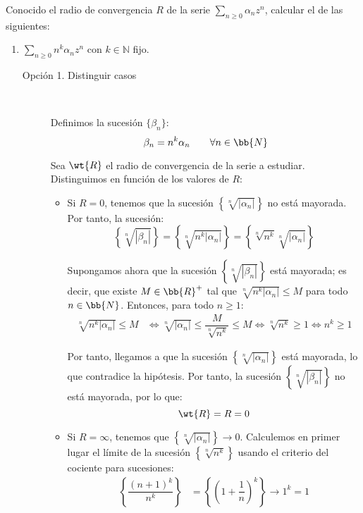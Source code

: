\begin{ejercicio}
    Conocido el radio de convergencia $R$ de la serie $\displaystyle \sum_{n \geq 0} \alpha_nz^n$, calcular el de las siguientes:
    \begin{enumerate}
        \item $\displaystyle \sum_{n \geq 0} n^k\alpha_nz^n$ con $k \in \mathbb{N}$ fijo.
        
        \begin{description}
            \item[Opción 1. Distinguir casos]~
            
            Definimos la sucesión $\{\beta_n\}$:
        \[
            \beta_n = n^k\alpha_n\qquad \forall n\in \bb{N}
        \]

        Sea $\wt{R}$ el radio de convergencia de la serie a estudiar. Distinguimos en función de los valores de $R$:
        \begin{itemize}
            \item Si $R=0$, tenemos que la sucesión $\left\{\sqrt[n]{|\alpha_n|}\right\}$ no está mayorada. Por tanto, la sucesión:
            \begin{equation*}
                \left\{\sqrt[n]{|\beta_n|}\right\} = \left\{\sqrt[n]{n^k|\alpha_n|}\right\}
                = \left\{\sqrt[n]{n^k}\sqrt[n]{|\alpha_n|}\right\}
            \end{equation*}

            Supongamos ahora que la sucesión $\left\{\sqrt[n]{|\beta_n|}\right\}$ está mayorada; es decir, que existe $M\in \bb{R}^+$ tal que $\sqrt[n]{n^k|\alpha_n|}\leq M$ para todo $n\in \bb{N}$. Entonces, para todo $n\geq 1$:
            \begin{align*}
                \sqrt[n]{n^k|\alpha_n|}\leq M &\iff \sqrt[n]{|\alpha_n|}\leq \dfrac{M}{\sqrt[n]{n^k}}\leq M\iff \sqrt[n]{n^k}\geq 1\iff n^k\geq 1
            \end{align*}

            Por tanto, llegamos a que la sucesión $\left\{\sqrt[n]{|\alpha_n|}\right\}$ está mayorada, lo que contradice la hipótesis. Por tanto, la sucesión $\left\{\sqrt[n]{|\beta_n|}\right\}$ no está mayorada, por lo que:
            \begin{equation*}
                \wt{R} = R=0
            \end{equation*}

            \item Si $R=\infty$, tenemos que $\left\{\sqrt[n]{|\alpha_n|}\right\}\to 0$. Calculemos en primer lugar el límite de la sucesión $\left\{\sqrt[n]{n^k}\right\}$ usando el criterio del cociente para sucesiones:
            \begin{align*}
                \left\{\dfrac{(n+1)^k}{n^k}\right\} &= \left\{\left(1+\dfrac{1}{n}\right)^k\right\}\to 1^k = 1
            \end{align*}


\end{itemize}
\end{description}
\end{enumerate}
\end{ejercicio}
